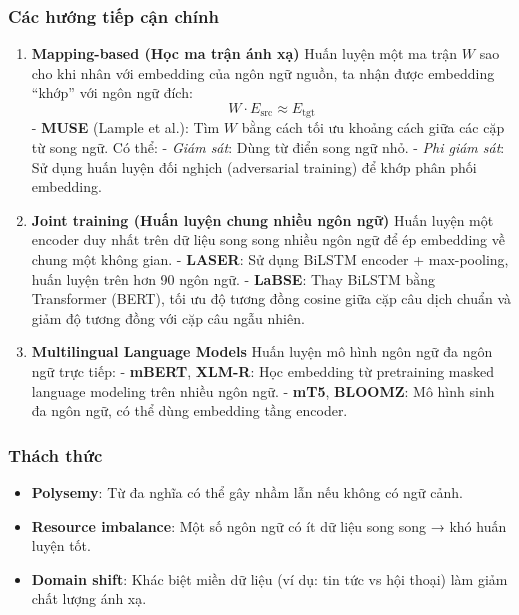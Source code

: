 \subsubsection*{Các hướng tiếp cận chính}
\begin{enumerate}
    \item \textbf{Mapping-based (Học ma trận ánh xạ)}  
    Huấn luyện một ma trận $W$ sao cho khi nhân với embedding của ngôn ngữ nguồn, ta nhận được embedding “khớp” với ngôn ngữ đích:  
    \[
    W \cdot E_{\text{src}} \approx E_{\text{tgt}}
    \]
    - \textbf{MUSE} (Lample et al.): Tìm $W$ bằng cách tối ưu khoảng cách giữa các cặp từ song ngữ. Có thể:
        - \textit{Giám sát}: Dùng từ điển song ngữ nhỏ.
        - \textit{Phi giám sát}: Sử dụng huấn luyện đối nghịch (adversarial training) để khớp phân phối embedding.
    
    \item \textbf{Joint training (Huấn luyện chung nhiều ngôn ngữ)}  
    Huấn luyện một encoder duy nhất trên dữ liệu song song nhiều ngôn ngữ để ép embedding về chung một không gian.
    - \textbf{LASER}: Sử dụng BiLSTM encoder + max-pooling, huấn luyện trên hơn 90 ngôn ngữ.
    - \textbf{LaBSE}: Thay BiLSTM bằng Transformer (BERT), tối ưu độ tương đồng cosine giữa cặp câu dịch chuẩn và giảm độ tương đồng với cặp câu ngẫu nhiên.
    
    \item \textbf{Multilingual Language Models}  
    Huấn luyện mô hình ngôn ngữ đa ngôn ngữ trực tiếp:
    - \textbf{mBERT}, \textbf{XLM-R}: Học embedding từ pretraining masked language modeling trên nhiều ngôn ngữ.
    - \textbf{mT5}, \textbf{BLOOMZ}: Mô hình sinh đa ngôn ngữ, có thể dùng embedding tầng encoder.
\end{enumerate}

\subsubsection*{Thách thức}
\begin{itemize}
    \item \textbf{Polysemy}: Từ đa nghĩa có thể gây nhầm lẫn nếu không có ngữ cảnh.
    \item \textbf{Resource imbalance}: Một số ngôn ngữ có ít dữ liệu song song → khó huấn luyện tốt.
    \item \textbf{Domain shift}: Khác biệt miền dữ liệu (ví dụ: tin tức vs hội thoại) làm giảm chất lượng ánh xạ.
\end{itemize}

